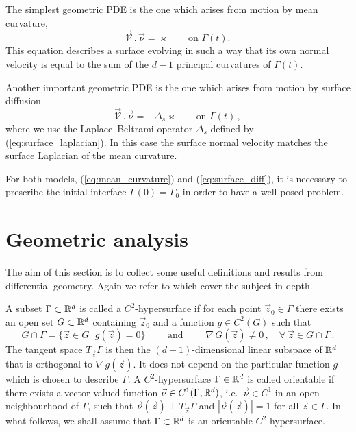 The simplest geometric PDE is the one which arises from motion by mean
curvature,
\begin{equation}\label{eq:mean_curvature}
\vec{\mathcal{V}}\,.\,\vec\nu=\varkappa\qquad\mbox{on }\Gamma(t).
\end{equation}
This equation describes a surface evolving in such a way that its own normal
velocity is equal to the sum of the $d-1$ principal curvatures of $\Gamma(t)$.

Another important geometric PDE is the one which arises from motion by
surface diffusion
\begin{equation}\label{eq:surface_diff}
\vec{\mathcal{V}}\,.\,\vec\nu=-\Delta_s \varkappa \qquad\mbox{on }\Gamma(t)\,,
\end{equation}
where we use the Laplace--Beltrami operator $\Delta_s$ defined by
(\ref{eq:surface_laplacian}). In this case the surface normal velocity matches
the surface Laplacian of the mean curvature.

For both models, (\ref{eq:mean_curvature}) and (\ref{eq:surface_diff}), it is
necessary to prescribe the initial interface $\Gamma(0)=\Gamma_0$ in order to
have a well posed problem.

\section[Geometric Analysis]{Geometric analysis}
The aim of this section is to collect some useful definitions and results from
differential geometry. Again we refer to \cite{DeckelnickDE05} which cover the
subject in depth.

A subset $\Gamma \subset {\mathbb R}^d$ is called a $C^2$-hypersurface if for each point
$\vec z_0 \in \Gamma$ there exists an open set $G \subset {\mathbb R}^d$ containing
$\vec z_0$ and a function $g \in C^2(G)$ such that
\begin{equation}
G \cap \Gamma = \{ \vec z \in G \, | \, g(\vec z) = 0 \}
\qquad \mbox{ and } \qquad \nabla \, G(\vec z) \neq 0\,,
\quad \forall\ \vec z \in G \cap \Gamma \, .
\end{equation}
The tangent space $T_{\vec z} \Gamma$ is then the $(d-1)$-dimensional linear
subspace of ${\mathbb R}^d$ that is orthogonal to $\nabla \, g(\vec z)$. It does not
depend on the particular function $g$ which is chosen to describe $\Gamma$. A
$C^2$-hypersurface $\Gamma \in {\mathbb R}^d$ is called orientable if there exists a
vector-valued function $\vec\nu \in C^1(\Gamma, {\mathbb R}^d)$, i.e.~$\vec\nu \in C^1$
in an open neighbourhood of $\Gamma$, such that $\vec\nu(\vec z) \perp T_{\vec
z} \Gamma$ and $|\vec{\nu}(\vec z)| = 1$ for all $\vec z \in \Gamma$. In what
follows, we shall assume that $\Gamma \subset {\mathbb R}^d$ is an orientable
$C^2$-hypersurface.

